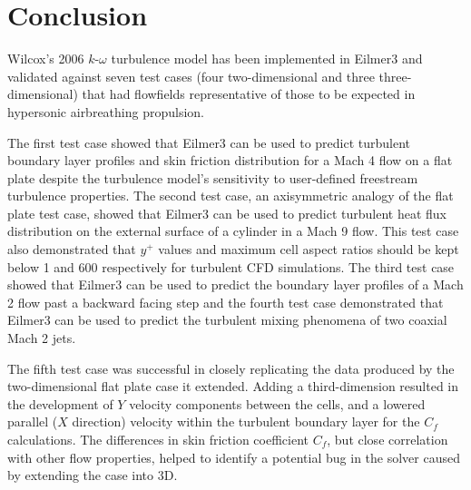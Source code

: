 
\newpage
\section{Conclusion}
\label{chapter-conclusion}
Wilcox's 2006 $k$-$\omega$ turbulence model has been implemented in 
Eilmer3 and validated against seven test cases (four two-dimensional and three three-dimensional) that had flowfields 
representative of those to be expected in hypersonic airbreathing 
propulsion. 

The first test case showed that Eilmer3 can be used to 
predict turbulent boundary layer profiles 
and skin friction distribution for a Mach 4 flow on a flat plate 
despite the turbulence model's sensitivity to user-defined freestream 
turbulence properties. The second test case, an axisymmetric analogy 
of the flat plate test case, showed that Eilmer3 can be used to 
predict turbulent heat flux distribution on the external surface of a cylinder 
in a Mach 9 flow. This test case also demonstrated that $y^+$ values
and maximum cell aspect ratios should be kept below 1 and 600
respectively for turbulent CFD simulations. The third test case showed
that Eilmer3 can be used to predict the boundary layer profiles of
a Mach 2 flow past a backward facing step and the fourth test case
demonstrated that Eilmer3 can be used to predict the turbulent mixing 
phenomena of two coaxial Mach 2 jets. 
%

The fifth test case was successful in closely replicating the data produced by the two-dimensional flat plate case it extended. Adding a third-dimension resulted in the development of $Y$ velocity components between the cells, and a lowered parallel ($X$ direction) velocity within the turbulent boundary layer for the $C_f$ calculations. The differences in skin friction coefficient $C_f$, but close correlation with other flow properties, helped to identify a potential bug in the solver caused by extending the case into 3D. 